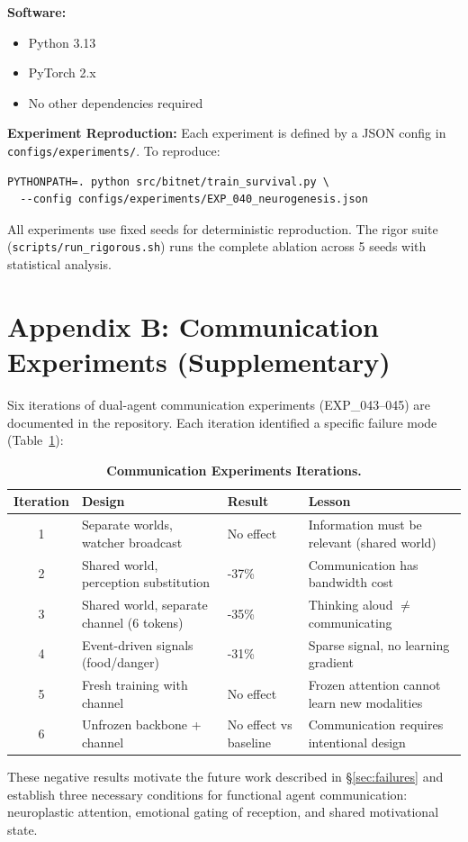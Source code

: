 \documentclass{article}
\begin{document}
\textbf{Software:}
\begin{itemize}
    \item Python 3.13
    \item PyTorch 2.x
    \item No other dependencies required
\end{itemize}

\textbf{Experiment Reproduction:}
Each experiment is defined by a JSON config in \texttt{configs/experiments/}. To reproduce:
\begin{verbatim}
PYTHONPATH=. python src/bitnet/train_survival.py \
  --config configs/experiments/EXP_040_neurogenesis.json
\end{verbatim}
All experiments use fixed seeds for deterministic reproduction. The rigor suite (\texttt{scripts/run\_rigorous.sh}) runs the complete ablation across 5 seeds with statistical analysis.

\section{Appendix B: Communication Experiments (Supplementary)}
Six iterations of dual-agent communication experiments (EXP\_043–045) are documented in the repository. Each iteration identified a specific failure mode (Table~\ref{tab:communication_failures}):

\begin{table}[h]
\centering
\caption{\textbf{Communication Experiments Iterations.}}
\label{tab:communication_failures}
\begin{tabularx}{\textwidth}{c p{4.5cm} p{2.5cm} X}
\toprule
\textbf{Iteration} & \textbf{Design} & \textbf{Result} & \textbf{Lesson} \\
\midrule
1 & Separate worlds, watcher broadcast & No effect & Information must be relevant (shared world) \\
2 & Shared world, perception substitution & -37\% & Communication has bandwidth cost \\
3 & Shared world, separate channel (6 tokens) & -35\% & Thinking aloud $\ne$ communicating \\
4 & Event-driven signals (food/danger) & -31\% & Sparse signal, no learning gradient \\
5 & Fresh training with channel & No effect & Frozen attention cannot learn new modalities \\
6 & Unfrozen backbone + channel & No effect vs baseline & Communication requires intentional design \\
\bottomrule
\end{tabularx}
\end{table}

These negative results motivate the future work described in \S\ref{sec:failures} and establish three necessary conditions for functional agent communication: neuroplastic attention, emotional gating of reception, and shared motivational state.
\end{document}
